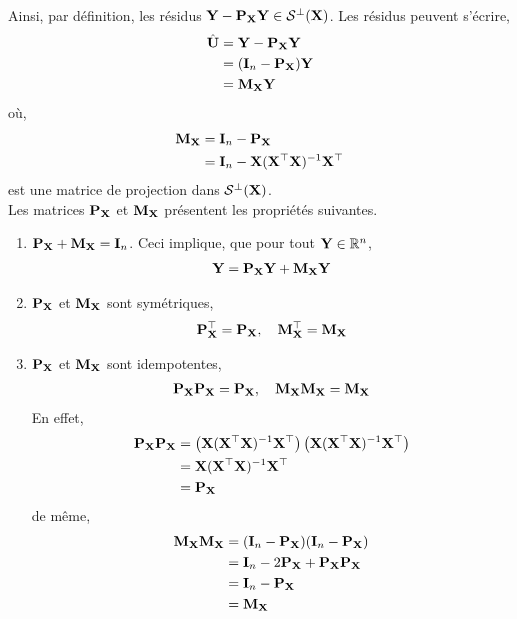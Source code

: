 Ainsi, par définition, les résidus $\mathbf Y - \mathbf P_\mathbf X\mathbf Y\in\mathcal{S}^\perp(\mathbf X)$. Les résidus peuvent s'écrire,
\begin{align*}
\hat{\mathbf U} &= \mathbf Y-\mathbf P_\mathbf X\mathbf Y \\
&= (\mathbf{I}_n - \mathbf P_\mathbf X)\mathbf Y\\
& = \mathbf M_\mathbf X\mathbf Y
\end{align*}
où,
\begin{align*}
\mathbf M_\mathbf X &= \mathbf{I}_n - \mathbf P_\mathbf X\\
& = \mathbf{I}_n - \mathbf X(\mathbf X^\top\mathbf X)^{-1}\mathbf X^\top
\end{align*}
est une matrice de projection dans $\mathcal{S}^\perp(\mathbf X)$.\\
Les matrices $\mathbf P_\mathbf X$ et $\mathbf M_\mathbf X$ présentent les propriétés suivantes.
\begin{enumerate}
\item $\mathbf P_\mathbf X+\mathbf M_\mathbf X = \mathbf{I}_n$. Ceci implique, que pour tout $\mathbf Y\in \mathbb{R}^n$,
\begin{align*}
\mathbf Y = \mathbf P_\mathbf X\mathbf Y+\mathbf M_\mathbf X\mathbf Y
\end{align*}
\item $\mathbf P_\mathbf X$ et $\mathbf M_\mathbf X$ sont symétriques,
\begin{align*}
\mathbf P_\mathbf X^\top = \mathbf P_\mathbf X, \ \ \ \mathbf M_\mathbf X^\top= \mathbf M_\mathbf X
\end{align*}
\item $\mathbf P_\mathbf X$ et $\mathbf M_\mathbf X$ sont idempotentes,
\begin{align*}
\mathbf P_\mathbf X\mathbf P_\mathbf X = \mathbf P_\mathbf X, \ \ \ \mathbf M_\mathbf X \mathbf M_\mathbf X= \mathbf M_\mathbf X
\end{align*}
En effet,
\begin{align*}
\mathbf P_\mathbf X\mathbf P_\mathbf X &= \left(\mathbf X(\mathbf X^\top\mathbf X)^{-1}\mathbf X^\top\right)\left(\mathbf X(\mathbf X^\top\mathbf X)^{-1}\mathbf X^\top\right)\\ 
&= \mathbf X(\mathbf X^\top\mathbf X)^{-1}\mathbf X^\top \\
&= \mathbf P_\mathbf X
\end{align*}
de même,
\begin{align*}
\mathbf M_\mathbf X\mathbf M_\mathbf X &= (\mathbf{I}_n - \mathbf P_\mathbf X)(\mathbf{I}_n - \mathbf P_\mathbf X)\\
& = \mathbf{I}_n - 2\mathbf P_\mathbf X + \mathbf P_\mathbf X\mathbf P_\mathbf X\\
&=\mathbf{I}_n - \mathbf P_\mathbf X\\
&=\mathbf M_\mathbf X
\end{align*}

\end{enumerate}
